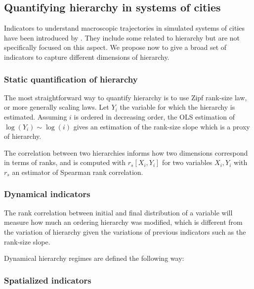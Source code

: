 \documentclass[english,fleqn,allpages]{ISTE_science}[2018/07/30]
\begin{document}
\subsection{Quantifying hierarchy in systems of cities}


Indicators to understand macroscopic trajectories in simulated systems of cities have been introduced by \cite{raimbault2020unveiling}. They include some related to hierarchy but are not specifically focused on this aspect. We propose now to give a broad set of indicators to capture different dimensions of hierarchy.


\subsubsection{Static quantification of hierarchy}

The most straightforward way to quantify hierarchy is to use Zipf rank-size law, or more generally scaling laws. Let $Y_i$ the variable for which the hierarchy is estimated. Assuming $i$ is ordered in decreasing order, the OLS estimation of $\log \left(Y_i\right) \sim \log \left( i\right)$ gives an estimation of the rank-size slope which is a proxy of hierarchy.


The correlation between two hierarchies informs how two dimensions correspond in terms of ranks, and is computed with $r_s\left[X_i,Y_i\right]$ for two variables $X_i,Y_i$ with $r_s$ an estimator of Spearman rank correlation.


\subsubsection{Dynamical indicators}

The rank correlation between initial and final distribution of a variable will measure how much an ordering hierarchy was modified, which is different from the variation of hierarchy given the variations of previous indicators such as the rank-size slope.

Dynamical hierarchy regimes are defined the following way: 


\subsubsection{Spatialized indicators}
\end{document}
